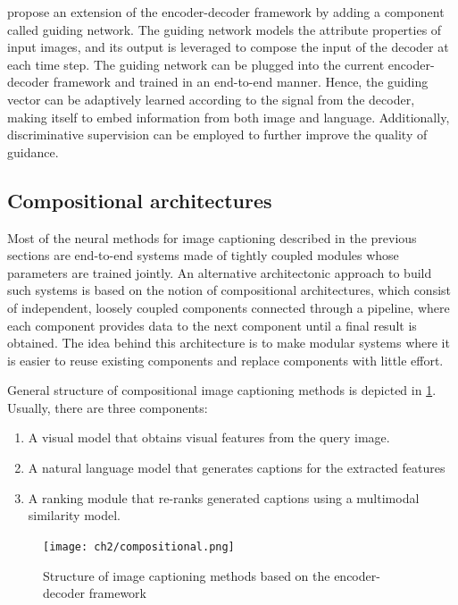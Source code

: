 \citet{Jiang2018} propose an extension of the encoder-decoder framework by adding a component called guiding network. The guiding network models the attribute properties of input images, and its output is leveraged to compose the input of the decoder at each time step. The guiding network can be plugged into the current encoder-decoder framework and trained in an end-to-end manner. Hence, the guiding vector can be adaptively learned according to the signal from the decoder, making itself to embed information from both image and language. Additionally, discriminative supervision can be employed to further improve the quality of guidance.

\subsection{Compositional architectures}\label{sec:compositional_architectures}

Most of the neural methods for image captioning described in the previous sections are end-to-end systems made of tightly coupled modules whose parameters are trained jointly. An alternative architectonic approach to build such systems is based on the notion of compositional architectures, which consist of independent, loosely coupled components connected through a pipeline, where each component provides data to the next component until a final result is obtained. The idea behind this architecture is to make modular systems where it is easier to reuse existing components and replace components with little effort.

General structure of compositional image captioning methods is depicted in \cref{fig:compositional}. Usually, there are three components: 
\begin{enumerate}
\item A visual model that obtains visual features from the query image.
\item A natural language model that generates captions for the extracted features
\item A ranking module that re-ranks generated captions using a multimodal similarity model.
\end{enumerate}

\begin{figure}[hpt]
	\centering
	\texttt{[image: ch2/compositional.png]}
	\caption{Structure of image captioning methods based on the encoder-decoder framework}
	\label{fig:compositional}
\end{figure}

